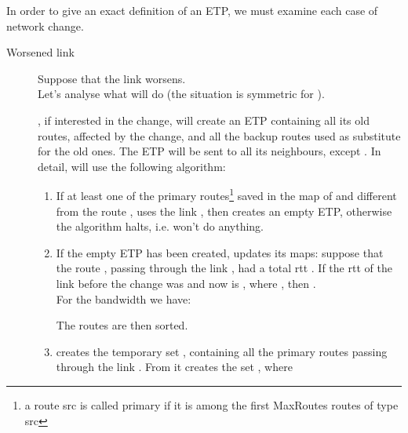 \documentclass[a4paper]{article}
\begin{document}
In order to give an exact definition of an ETP, we must examine each case of network change.
\begin{description}
	\item[Worsened link] 
		\label{wlink}
		Suppose that the link  worsens.\\
		Let's analyse what  will do (the situation is symmetric for
		).

		, if interested in the change, will create an ETP
		containing all its old routes, affected by the change, and all
		the backup routes used as substitute for the old ones. The ETP
		will be sent to all its neighbours, except . In detail,
		 will use the following algorithm:
		\begin{enumerate}
		\item If at least one of the primary
		       routes\footnote{
				a route src is called primary
				if it is among the first MaxRoutes routes of
				type src}
			saved in the map
			of  and different from the route , uses the link , then  creates an
			empty ETP, otherwise the algorithm halts, i.e. 
			won't do anything.
		\item \label{upmap}
			If the empty ETP has been created,  updates its maps:
			suppose that the route , passing through the link
			, had a total rtt . If the rtt of the link
			 before the change was  and now is
			, where , then
			.\\
			For the bandwidth we have:
			
			The routes are then sorted.
		\item \label{stepR} 
			 creates the temporary set , 
			containing all the primary
			routes passing through the link . From 
			it creates the set , where
			

\end{enumerate}
\end{description}
\end{document}
